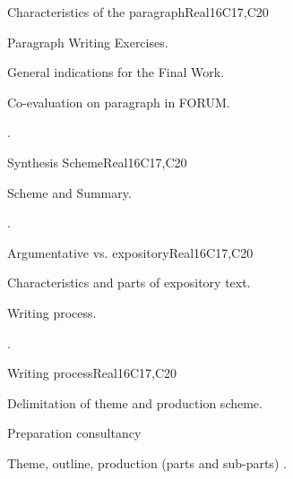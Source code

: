 \begin{syllabus}
\begin{unit}{Characteristics of the paragraph}{}{Real}{16}{C17,C20}
  \begin{topics}
      \item Paragraph Writing Exercises.
      \item General indications for the Final Work.
      \item Co-evaluation on paragraph in FORUM.
  \end{topics}

  \begin{learningoutcomes}
   \item .%
  \end{learningoutcomes}
\end{unit}

\begin{unit}{Synthesis Scheme}{}{Real}{16}{C17,C20}
  \begin{topics}
      \item Scheme and Summary.
  \end{topics}

  \begin{learningoutcomes}
   \item .%
  \end{learningoutcomes}
\end{unit}

\begin{unit}{Argumentative vs. expository}{}{Real}{16}{C17,C20}
  \begin{topics}
      \item Characteristics and parts of expository text.
      \item Writing process.
  \end{topics}

  \begin{learningoutcomes}
   \item .%
  \end{learningoutcomes}
\end{unit}

\begin{unit}{Writing process}{}{Real}{16}{C17,C20}
  \begin{topics}
      \item Delimitation of theme and production scheme.
      \item Preparation consultancy
      \item Theme, outline, production (parts and sub-parts) .
  \end{topics}


\end{unit}
\end{syllabus}
